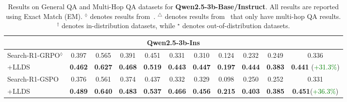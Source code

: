 \begin{table}[t]
{\begin{tabular}{l|ccc|c|cccc|c|c}
\midrule
\multicolumn{11}{c}{Qwen2.5-3b-Ins} \\
\midrule
Search-R1-GRPO$^{\lozenge}$    & 0.397 & 0.565 & 0.391 & 0.451 & 0.331 & 0.310 & 0.124 & 0.232 & 0.249 & 0.336 \\
+LLDS       & \textbf{0.462} & \textbf{0.627} & \textbf{0.468} & \textbf{0.519} & \textbf{0.443} & \textbf{0.447} & \textbf{0.197} & \textbf{0.444} & \textbf{0.383} & \textbf{0.441} (\textcolor{green}{+31.3\%})  \\
\midrule
Search-R1-GSPO
& 0.376 
& 0.561 
& 0.374 
& 0.437
& 0.332 
& 0.329 
& 0.098 
& 0.250
& 0.252
& 0.331 \\
+LLDS
& \textbf{0.489} & \textbf{0.640} & \textbf{0.483} 
& \textbf{0.537}
& \textbf{0.466} & \textbf{0.456} & \textbf{0.215} & \textbf{0.403}
& \textbf{0.385}
&\textbf{0.451}(\textcolor{green}{+36.3\%}) \\
\bottomrule
\end{tabular}
}
\caption{Results on General QA and Multi-Hop QA datasets for \textbf{Qwen2.5-3b-Base/Instruct}. All results are reported using Exact Match (EM).
$^{\lozenge}$ denotes results from~\cite{jin2025search}. $^{\triangle}$ denotes results from~\cite{zhang2025criticsearch} that only have multi-hop QA results.
$^{\dagger}$ denotes in-distribution datasets, while $^{\star}$ denotes out-of-distribution datasets.}
\label{tab:qa_results_3b}
\vspace{-3mm}
\end{table}
